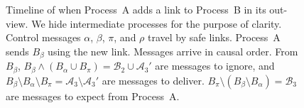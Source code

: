 

%     

\begin{figure}
  \begin{center}
    
    \caption{\label{fig:timelineproof}\label{fig:timeline}Timeline of
      \RPCBROADCAST when Process~A adds a link to Process~B in its out-view. We
      hide intermediate processes for the purpose of clarity. Control messages
      $\alpha$, $\beta$, $\pi$, and $\rho$ travel by safe links. Process~A sends
      $B_\beta$ using the new link. Messages arrive in causal order. From 
      $B_\beta$,
      $B_\beta \wedge (B_\alpha \cup B_\pi) = \mathcal{B}_2 \cup \mathcal{A}_3'$
      are messages to ignore, and
      $B_\beta \setminus B_\alpha \setminus B_\pi = \mathcal{A}_3\setminus
      \mathcal{A}_3'$
      are messages to deliver.
      $B_\pi \setminus (B_\beta \setminus B_\alpha) = \mathcal{B}_3$ are
      messages to expect from Process~A.}
  \end{center}
\end{figure}



